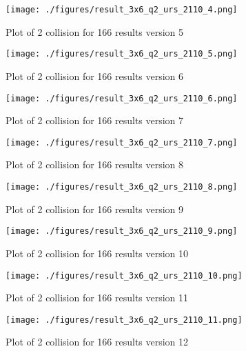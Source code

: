 \begin{figure}[!htb]
    \centering
    \texttt{[image: ./figures/result\_3x6\_q2\_urs\_2110\_4.png]}
    \caption{Plot of 2 collision for 166 results version 5}
    \label{fig:67_v0}
\end{figure}

\begin{figure}[!htb]
    \centering
    \texttt{[image: ./figures/result\_3x6\_q2\_urs\_2110\_5.png]}
    \caption{Plot of 2 collision for 166 results version 6}
    \label{fig:67_v0}
\end{figure}

\begin{figure}[!htb]
    \centering
    \texttt{[image: ./figures/result\_3x6\_q2\_urs\_2110\_6.png]}
    \caption{Plot of 2 collision for 166 results version 7}
    \label{fig:67_v0}
\end{figure}

\begin{figure}[!htb]
    \centering
    \texttt{[image: ./figures/result\_3x6\_q2\_urs\_2110\_7.png]}
    \caption{Plot of 2 collision for 166 results version 8}
    \label{fig:67_v0}
\end{figure}

\begin{figure}[!htb]
    \centering
    \texttt{[image: ./figures/result\_3x6\_q2\_urs\_2110\_8.png]}
    \caption{Plot of 2 collision for 166 results version 9}
    \label{fig:67_v0}
\end{figure}

\begin{figure}[!htb]
    \centering
    \texttt{[image: ./figures/result\_3x6\_q2\_urs\_2110\_9.png]}
    \caption{Plot of 2 collision for 166 results version 10}
    \label{fig:67_v0}
\end{figure}

\begin{figure}[!htb]
    \centering
    \texttt{[image: ./figures/result\_3x6\_q2\_urs\_2110\_10.png]}
    \caption{Plot of 2 collision for 166 results version 11}
    \label{fig:67_v0}
\end{figure}

\begin{figure}[!htb]
    \centering
    \texttt{[image: ./figures/result\_3x6\_q2\_urs\_2110\_11.png]}
    \caption{Plot of 2 collision for 166 results version 12}
    \label{fig:67_v0}
\end{figure}

